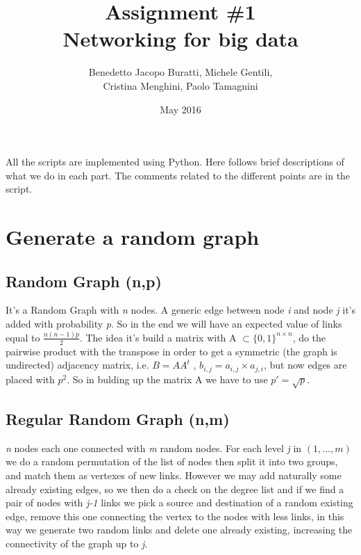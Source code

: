 \documentclass[10pt,a4paper]{article}
\begin{document}
\title{Assignment \#1 \\ Networking for big data}
\author{Benedetto Jacopo Buratti, Michele Gentili, \\ Cristina Menghini, Paolo Tamagnini}
\date{May 2016}
\maketitle

All the scripts are implemented using Python. Here follows brief descriptions of what we do in each part. The comments related to the different points are in the script.


\section{Generate a random graph}

\subsection*{Random Graph (n,p)}

It's a Random Graph with \emph{n} nodes. A generic edge between node \emph{i} and node \emph{j} it's added with probability \emph{p}. So in the end we will have an expected value of links equal to $\frac{n(n-1)p}{2}.$
The idea it's build a matrix with A $\subset \{0,1\}^{n \times n}$, do the pairwise product with the transpose in order to get a symmetric (the graph is undirected) adjacency matrix, i.e. $B=AA^t$ , $b_{i,j}= a_{i,j} \times a_{j,i}$,  but now edges are placed with $p^2$. So in bulding up the matrix A we have to use $p'=\sqrt{p}$.

\subsection*{Regular Random Graph (n,m)}

\emph{n} nodes each one connected with \emph{m} random nodes.
For each level \emph{j} in $(1,...,m)$ we do a random permutation of the list of nodes then split it into two groups, and match them as vertexes of new links. However we may add naturally some already existing edges, so we then do a check on the degree list and if we find a pair of nodes with \emph{j-1} links we pick a source and destination of a random existing edge, remove this one connecting the vertex to the nodes with less links, in this way we generate two random links and delete one already existing, increasing the connectivity of the graph up to \emph{j}.
\end{document}
